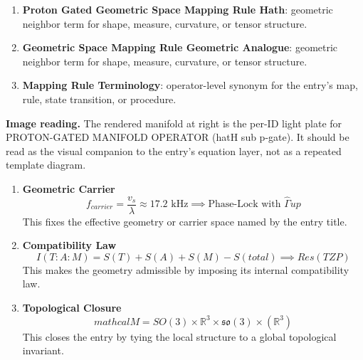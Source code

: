 \begin{enumerate}[leftmargin=1.6em,itemsep=6pt,topsep=4pt]
\item \textbf{Proton Gated Geometric Space Mapping Rule Hath}: geometric neighbor term for shape, measure, curvature, or tensor structure.
\item \textbf{Geometric Space Mapping Rule Geometric Analogue}: geometric neighbor term for shape, measure, curvature, or tensor structure.
\item \textbf{Mapping Rule Terminology}: operator-level synonym for the entry's map, rule, state transition, or procedure.
\end{enumerate}

\begin{samepage}
\noindent\begin{minipage}[t]{0.45\linewidth}
\vspace{0pt}
\raggedright
\scriptsize\textbf{Image reading.} The rendered manifold at right is the per-ID light plate for PROTON-GATED MANIFOLD OPERATOR (hatH sub p-gate). It should be read as the visual companion to the entry's equation layer, not as a repeated template diagram.\par
\end{minipage}\hfill
\begin{minipage}[t]{0.53\linewidth}
\vspace*{-0.10in}
\raggedright
{}
\end{minipage}
\end{samepage}

\clearpage


\begin{enumerate}[leftmargin=1.6em,itemsep=9pt,topsep=6pt]
\item \textbf{Geometric Carrier}
\[
f_{carrier} = \frac{v_s}{\lambda} \approx 17.2 \text{ kHz} \implies \text{Phase-Lock with } \hat{\Gamma} {up}
\]
This fixes the effective geometry or carrier space named by the entry title.

\item \textbf{Compatibility Law}
\[
I(T:A:M) = S(T) + S(A) + S(M) - S(total) \implies Res(TZP)
\]
This makes the geometry admissible by imposing its internal compatibility law.

\item \textbf{Topological Closure}
\[
mathcal{M}=SO(3)\times\mathbb{R}^{3}\times\mathfrak{so}(3)^{ }\times(\mathbb{R}^{3})^{ }
\]
This closes the entry by tying the local structure to a global topological invariant.
\end{enumerate}

